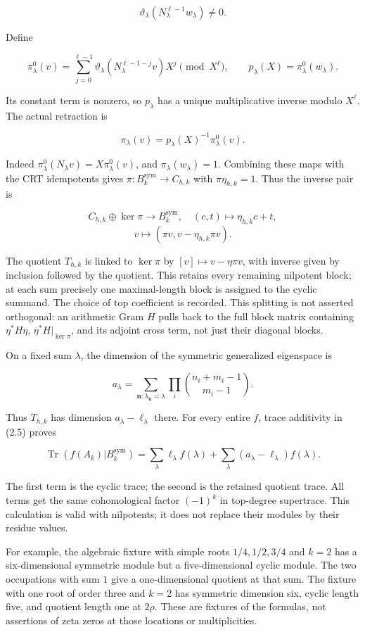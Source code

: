 \documentclass[
]{article}
\begin{document}
\[\vartheta_\lambda(N_\lambda^{\ell-1}w_\lambda)\ne0.\]

Define

\[\pi^0_\lambda(v)=\sum_{j=0}^{\ell-1}
\vartheta_\lambda(N_\lambda^{\ell-1-j}v)X^j\pmod{X^\ell},\qquad
p_\lambda(X)=\pi^0_\lambda(w_\lambda).\]

Its constant term is nonzero, so \(p_\lambda\) has a unique
multiplicative inverse modulo \(X^\ell\). The actual retraction is

\[\boxed{\pi_\lambda(v)=p_\lambda(X)^{-1}\pi^0_\lambda(v).}\tag{2.5a}\]

Indeed \(\pi^0_\lambda(N_\lambda v)=X\pi^0_\lambda(v)\), and
\(\pi_\lambda(w_\lambda)=1\). Combining these maps with the CRT
idempotents gives \(\pi:B_k^{\mathrm{sym}}\to C_{h,k}\) with
\(\pi\eta_{h,k}=1\). Thus the inverse pair is

\[C_{h,k}\oplus\ker\pi\longrightarrow B_k^{\mathrm{sym}},\quad(c,t)\mapsto\eta_{h,k}c+t,\]
\[v\longmapsto(\pi v,v-\eta_{h,k}\pi v).\tag{2.5b}\]

The quotient \(T_{h,k}\) is linked to \(\ker\pi\) by
\([v]\mapsto v-\eta\pi v\), with inverse given by inclusion followed by
the quotient. This retains every remaining nilpotent block; at each sum
precisely one maximal-length block is assigned to the cyclic summand.
The choice of top coefficient is recorded. This splitting is not
asserted orthogonal: an arithmetic Gram \(H\) pulls back to the full
block matrix containing \(\eta^*H\eta\), \(\eta^*H|_{\ker\pi}\), and its
adjoint cross term, not just their diagonal blocks.

On a fixed sum \(\lambda\), the dimension of the symmetric generalized
eigenspace is

\[a_\lambda=\sum_{\mathbf n:\lambda_{\mathbf n}=\lambda}
\prod_i\binom{n_i+m_i-1}{m_i-1}.\tag{2.6}\]

Thus \(T_{h,k}\) has dimension \(a_\lambda-\ell_\lambda\) there. For
every entire \(f\), trace additivity in (2.5) proves

\[\operatorname{Tr}(f(A_k)|B_k^{\mathrm{sym}})=
\sum_\lambda \ell_\lambda f(\lambda)
+\sum_\lambda(a_\lambda-\ell_\lambda)f(\lambda).\tag{2.7}\]

The first term is the cyclic trace; the second is the retained quotient
trace. All terms get the same cohomological factor \((-1)^k\) in
top-degree supertrace. This calculation is valid with nilpotents; it
does not replace their modules by their residue values.

For example, the algebraic fixture with simple roots \(1/4,1/2,3/4\) and
\(k=2\) has a six-dimensional symmetric module but a five-dimensional
cyclic module. The two occupations with sum \(1\) give a one-dimensional
quotient at that sum. The fixture with one root of order three and
\(k=2\) has symmetric dimension six, cyclic length five, and quotient
length one at \(2\rho\). These are fixtures of the formulas, not
assertions of zeta zeros at those locations or multiplicities.
\end{document}
